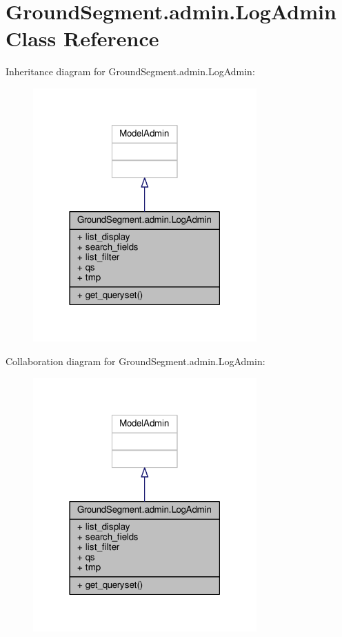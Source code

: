 \hypertarget{class_ground_segment_1_1admin_1_1_log_admin}{}\section{Ground\+Segment.\+admin.\+Log\+Admin Class Reference}
\label{class_ground_segment_1_1admin_1_1_log_admin}


Inheritance diagram for Ground\+Segment.\+admin.\+Log\+Admin\+:\nopagebreak
\begin{figure}[H]
\begin{center}
\leavevmode
\includegraphics[width=243pt]{class_ground_segment_1_1admin_1_1_log_admin__inherit__graph}
\end{center}
\end{figure}


Collaboration diagram for Ground\+Segment.\+admin.\+Log\+Admin\+:\nopagebreak
\begin{figure}[H]
\begin{center}
\leavevmode
\includegraphics[width=243pt]{class_ground_segment_1_1admin_1_1_log_admin__coll__graph}
\end{center}
\end{figure}
